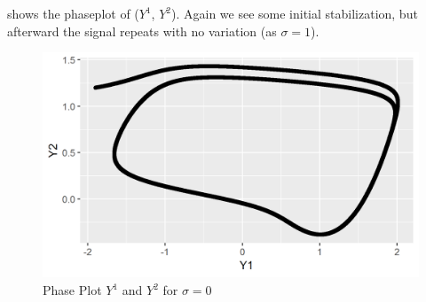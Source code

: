 \documentclass[a4paper]{article}
\begin{document}
 shows the phaseplot of ($Y^1$, $Y^2$). Again we see some initial stabilization, but afterward the signal repeats with no variation (as $\sigma = 1$).
\begin{figure}[ht!]
    \centering
    \includegraphics[width=.45\textwidth]{part1a-sigma0-Y1Y2.png}
    \caption{Phase Plot $Y^1$ and $Y^2$ for $\sigma = 0$}
    \label{fig:part1a-sigma0-Y1Y2}
\end{figure}
\end{document}

